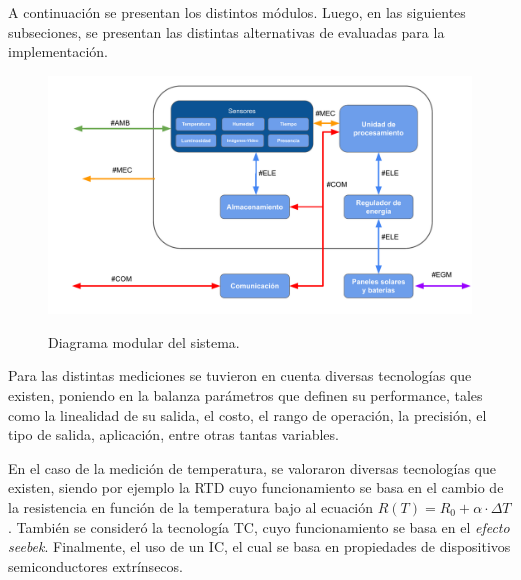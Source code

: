 




A continuación se presentan los distintos módulos. Luego, en las siguientes subseciones, se presentan las distintas alternativas de evaluadas para la implementación.

\begin{figure}[H]
	\centering
	\includegraphics[width=0.8\linewidth]{ImagenesFactibilidad/EsquemaModular}
	\label{fig:esquema_modular}
	\caption{Diagrama modular del sistema.}
\end{figure}


Para las distintas mediciones se tuvieron en cuenta diversas tecnologías que existen, poniendo en la balanza parámetros que definen su performance, tales como la linealidad de su salida, el costo, el rango de operación, la precisión, el tipo de salida, aplicación, entre otras tantas variables.

En el caso de la medición de temperatura, se valoraron diversas tecnologías que existen, siendo por ejemplo la RTD cuyo funcionamiento se basa en el cambio de la resistencia en función de la temperatura bajo al ecuación $R(T)=R_0 + \alpha \cdot \Delta T$. También se consideró la tecnología TC, cuyo funcionamiento se basa en el \textit{efecto seebek}. Finalmente, el uso de un IC, el cual se basa en propiedades de dispositivos semiconductores extrínsecos.

